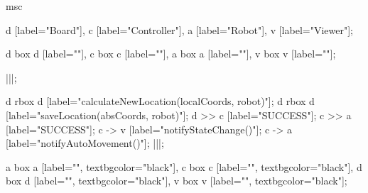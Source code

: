 
\begin{msc}
msc
{

d [label="Board"],
c [label="Controller"],
a [label="Robot"],
v [label="Viewer"];

d box d [label=""],
c box c [label=""],
a box a [label=""],
v box v [label=""];

|||;

d rbox d [label="calculateNewLocation(localCoords, robot)"];
d rbox d [label="saveLocation(absCoords, robot)"];
d >> c [label="SUCCESS"];
c >> a [label="SUCCESS"];
c -> v [label="notifyStateChange()"];
c -> a [label="notifyAutoMovement()"];
|||;

a box a [label="", textbgcolor="black"],
c box c [label="", textbgcolor="black"],
d box d [label="", textbgcolor="black"],
v box v [label="", textbgcolor="black"];

}
\end{msc}
